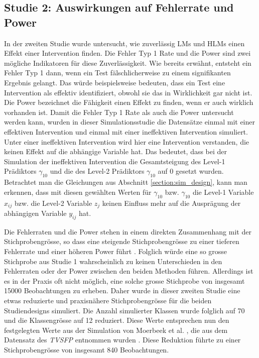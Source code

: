 \documentclass[12pt]{article}\usepackage[]{graphicx}\usepackage[]{color}
\begin{document}
\subsection{Studie 2: Auswirkungen auf Fehlerrate und Power}
In der zweiten Studie wurde untersucht, wie zuverlässig LMs und HLMs einen Effekt einer Intervention finden. Die Fehler Typ 1 Rate und die Power sind zwei mögliche Indikatoren für diese Zuverlässigkeit. Wie bereits erwähnt, entsteht ein Fehler Typ 1 dann, wenn ein Test fälschlicherweise zu einem signifikanten Ergebnis gelangt. Das würde beispielsweise bedeuten, dass ein Test eine Intervention als effektiv identifiziert, obwohl sie das in Wirklichkeit gar nicht ist. Die Power bezeichnet die Fähigkeit einen Effekt zu finden, wenn er auch wirklich vorhanden ist. Damit die Fehler Typ 1 Rate als auch die Power untersucht werden kann, wurden in dieser Simulationsstudie die Datensätze einmal mit einer effektiven Intervention und einmal mit einer ineffektiven Intervention simuliert. Unter einer ineffektiven Intervention wird hier eine Intervention verstanden, die keinen Effekt auf die abhängige Variable hat. Das bedeutet, dass bei der Simulation der ineffektiven Intervention die Gesamtsteigung des Level-1 Prädiktors $\gamma_{10}$ und die des Level-2 Prädiktors $\gamma_{10}$ auf 0 gesetzt wurden. Betrachtet man die Gleichungen aus Abschnitt \ref{section:sim_design}, kann man erkennen, dass mit diesen gewählten Werten für $\gamma_{10}$ bzw. $\gamma_{10}$ die Level-1 Variable $x_{ij}$ bzw. die Level-2 Variable $z_{j}$ keinen Einfluss mehr auf die Ausprägung der abhängigen Variable $y_{ij}$ hat.

Die Fehlerraten und die Power stehen in einem direkten Zusammenhang mit der Stichprobengrösse, so dass eine steigende Stichprobengrösse zu einer tieferen Fehlerrate und einer höheren Power führt \citep{snijders2005samplesizepower}. Folglich würde eine so grosse Stichprobe aus Studie 1 wahrscheinlich zu keinen Unterschieden in den Fehlerraten oder der Power zwischen den beiden Methoden führen. Allerdings ist es in der Praxis oft nicht möglich, eine solche grosse Stichprobe von insgesamt 15000 Beobachtungen zu erheben. Daher wurde in dieser zweiten Studie eine etwas reduzierte und praxisnähere Stichprobengrösse für die beiden Studiendesigns simuliert. Die Anzahl simulierter Klassen wurde folglich auf 70 und die Klassengrösse auf 12 reduziert. Diese Werte entsprechen nun  den festgelegten Werte aus der Simulation von Moerbeek et al. \citeyearpar{MOERBEEK2003341}, die aus dem Datensatz des \textit{TVSFP} entnommen wurden \citep{FLAY1995smoking}. Diese Reduktion führte zu einer Stichprobengrösse von insgesamt 840 Beobachtungen. 
\end{document}
